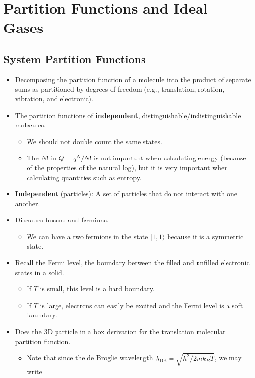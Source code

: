 \documentclass[../notes.tex]{subfiles}
\begin{document}
\chapter{Partition Functions and Ideal Gases}
\section{System Partition Functions}
\begin{itemize}
    \item {}Decomposing the partition function of a molecule into the product of separate sums as partitioned by degrees of freedom (e.g., translation, rotation, vibration, and electronic).
    \item The partition functions of \textbf{independent}, distinguishable/indistinguishable molecules.
    \begin{itemize}
        \item We should not double count the same states.
        \item The $N!$ in $Q=q^N/N!$ is not important when calculating energy (because of the properties of the natural log), but it is very important when calculating quantities such as entropy.
    \end{itemize}
    \item \textbf{Independent} (particles): A set of particles that do not interact with one another.
    \item Discusses bosons and fermions.
    \begin{itemize}
        \item We can have a two fermions in the state $|1,1\rangle$ because it is a symmetric state.
    \end{itemize}
    \item Recall the Fermi level, the boundary between the filled and unfilled electronic states in a solid.
    \begin{itemize}
        \item If $T$ is small, this level is a hard boundary.
        \item If $T$ is large, electrons can easily be excited and the Fermi level is a soft boundary.
    \end{itemize}
    \item Does the 3D particle in a box derivation for the translation molecular partition function.
    \begin{itemize}
        \item Note that since the de Broglie wavelength $\lambda_\text{DB}=\sqrt{h^2/2mk_BT}$, we may write

\end{itemize}
\end{itemize}
\end{document}
